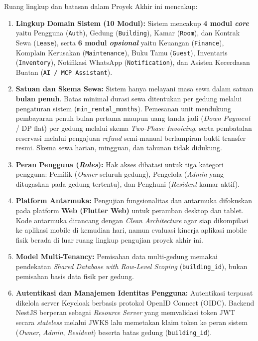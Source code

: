 Ruang lingkup dan batasan dalam Proyek Akhir ini mencakup:
\begin{enumerate}[label=\arabic*., leftmargin=*]
  \item \textbf{Lingkup Domain Sistem (10 Modul):} Sistem mencakup \textbf{4 modul \textit{core}} yaitu Pengguna (\texttt{Auth}), Gedung (\texttt{Building}), Kamar (\texttt{Room}), dan Kontrak Sewa (\texttt{Lease}), serta \textbf{6 modul \textit{opsional}} yaitu Keuangan (\texttt{Finance}), Komplain Kerusakan (\texttt{Maintenance}), Buku Tamu (\texttt{Guest}), Inventaris (\texttt{Inventory}), Notifikasi WhatsApp (\texttt{Notification}), dan Asisten Kecerdasan Buatan (\texttt{AI / MCP Assistant}).
  \item \textbf{Satuan dan Skema Sewa:} Sistem hanya melayani masa sewa dalam satuan \textbf{bulan penuh}. Batas minimal durasi sewa ditentukan per gedung melalui pengaturan sistem (\texttt{min\_rental\_months}). Pemesanan unit mendukung pembayaran penuh bulan pertama maupun uang tanda jadi (\textit{Down Payment} / DP flat) per gedung melalui skema \textit{Two-Phase Invoicing}, serta pembatalan reservasi melalui pengajuan \textit{refund} semi-manual berlampiran bukti transfer resmi. Skema sewa harian, mingguan, dan tahunan tidak didukung.
  \item \textbf{Peran Pengguna (\textit{Roles}):} Hak akses dibatasi untuk tiga kategori pengguna: Pemilik (\textit{Owner} seluruh gedung), Pengelola (\textit{Admin} yang ditugaskan pada gedung tertentu), dan Penghuni (\textit{Resident} kamar aktif).
  \item \textbf{Platform Antarmuka:} Pengujian fungsionalitas dan antarmuka difokuskan pada platform \textbf{Web (Flutter Web)} untuk peramban desktop dan tablet. Kode antarmuka dirancang dengan \textit{Clean Architecture} agar siap dikompilasi ke aplikasi mobile di kemudian hari, namun evaluasi kinerja aplikasi mobile fisik berada di luar ruang lingkup pengujian proyek akhir ini.
  \item \textbf{Model Multi-Tenancy:} Pemisahan data multi-gedung memakai pendekatan \textit{Shared Database with Row-Level Scoping} (\texttt{building\_id}), bukan pemisahan basis data fisik per gedung.
  \item \textbf{Autentikasi dan Manajemen Identitas Pengguna:} Autentikasi terpusat dikelola server Keycloak berbasis protokol OpenID Connect (OIDC). Backend NestJS berperan sebagai \textit{Resource Server} yang memvalidasi token JWT secara \textit{stateless} melalui JWKS lalu memetakan klaim token ke peran sistem (\textit{Owner}, \textit{Admin}, \textit{Resident}) beserta batas gedung (\texttt{building\_id}).

\end{enumerate}
